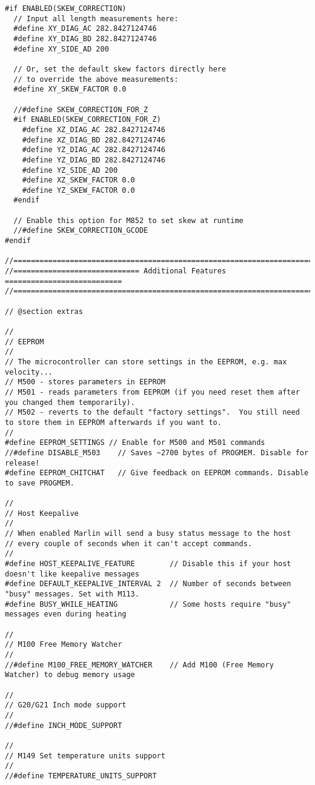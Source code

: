 \begin{lstlisting}[caption = キャプション, label = ラベル]
#if ENABLED(SKEW_CORRECTION)
  // Input all length measurements here:
  #define XY_DIAG_AC 282.8427124746
  #define XY_DIAG_BD 282.8427124746
  #define XY_SIDE_AD 200

  // Or, set the default skew factors directly here
  // to override the above measurements:
  #define XY_SKEW_FACTOR 0.0

  //#define SKEW_CORRECTION_FOR_Z
  #if ENABLED(SKEW_CORRECTION_FOR_Z)
    #define XZ_DIAG_AC 282.8427124746
    #define XZ_DIAG_BD 282.8427124746
    #define YZ_DIAG_AC 282.8427124746
    #define YZ_DIAG_BD 282.8427124746
    #define YZ_SIDE_AD 200
    #define XZ_SKEW_FACTOR 0.0
    #define YZ_SKEW_FACTOR 0.0
  #endif

  // Enable this option for M852 to set skew at runtime
  //#define SKEW_CORRECTION_GCODE
#endif

//=============================================================================
//============================= Additional Features ===========================
//=============================================================================

// @section extras

//
// EEPROM
//
// The microcontroller can store settings in the EEPROM, e.g. max velocity...
// M500 - stores parameters in EEPROM
// M501 - reads parameters from EEPROM (if you need reset them after you changed them temporarily).
// M502 - reverts to the default "factory settings".  You still need to store them in EEPROM afterwards if you want to.
//
#define EEPROM_SETTINGS // Enable for M500 and M501 commands
//#define DISABLE_M503    // Saves ~2700 bytes of PROGMEM. Disable for release!
#define EEPROM_CHITCHAT   // Give feedback on EEPROM commands. Disable to save PROGMEM.

//
// Host Keepalive
//
// When enabled Marlin will send a busy status message to the host
// every couple of seconds when it can't accept commands.
//
#define HOST_KEEPALIVE_FEATURE        // Disable this if your host doesn't like keepalive messages
#define DEFAULT_KEEPALIVE_INTERVAL 2  // Number of seconds between "busy" messages. Set with M113.
#define BUSY_WHILE_HEATING            // Some hosts require "busy" messages even during heating

//
// M100 Free Memory Watcher
//
//#define M100_FREE_MEMORY_WATCHER    // Add M100 (Free Memory Watcher) to debug memory usage

//
// G20/G21 Inch mode support
//
//#define INCH_MODE_SUPPORT

//
// M149 Set temperature units support
//
//#define TEMPERATURE_UNITS_SUPPORT


\end{lstlisting}
